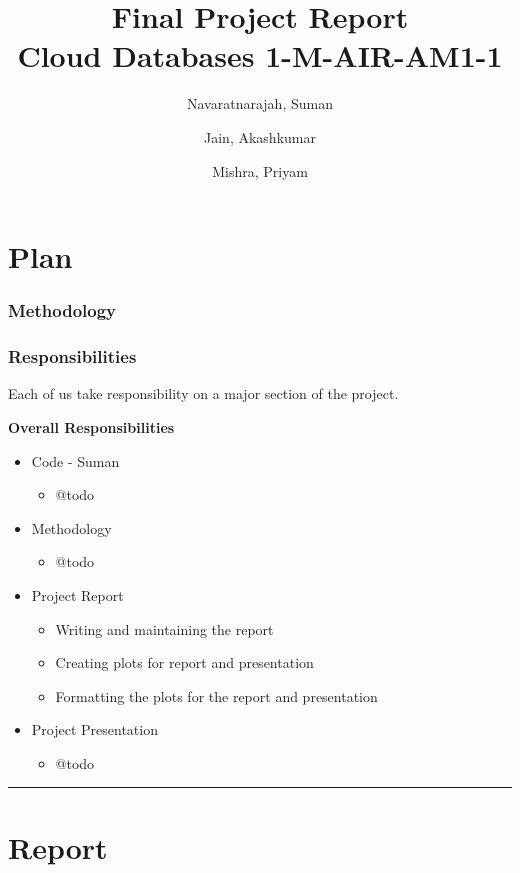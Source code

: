 \documentclass[10pt,a4paper,twocolumn]{article}
\author{
Navaratnarajah, Suman\\
\and
Jain, Akashkumar
\and
Mishra, Priyam
}
\begin{document}
\title{
    Final Project Report\\
    \large Cloud Databases 1-M-AIR-AM1-1
}
\maketitle
\part{Plan}

\section{Methodology}

\section{Responsibilities}
Each of us take responsibility on a major section of the project.

\textbf{Overall Responsibilities}
\begin{itemize}
    \item Code - Suman
    \begin{itemize}
        \item @todo
    \end{itemize}
    \item Methodology
    \begin{itemize}
        \item @todo
    \end{itemize}
    \item Project Report
    \begin{itemize}
        \item Writing and maintaining the report
        \item Creating plots for report and presentation
        \item Formatting the plots for the report and presentation
    \end{itemize}
    \item Project Presentation
        \begin{itemize}
            \item @todo
    \end{itemize}
\end{itemize}

\rule{0.9\columnwidth}{0.5pt}
\part{Report}
\end{document}
